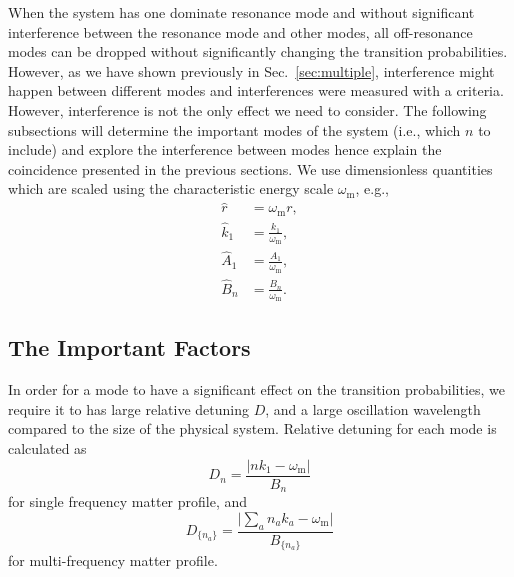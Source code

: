 \documentclass[%
reprint,
 amsmath,amssymb,
 prd,
]{revtex4-1}
\newcommand{\RD}{D}
\begin{document}
When the system has one dominate resonance mode and without significant interference between the resonance mode and other modes, all off-resonance modes can be dropped without significantly changing the transition probabilities. However, as we have shown previously in Sec.~\ref{sec:multiple}, interference might happen between different modes and interferences were measured with a criteria. However, interference is not the only effect we need to consider. The following subsections will determine the important modes of the system (i.e., which $n$ to include) and explore the interference between modes hence explain the coincidence presented in the previous sections. We use dimensionless quantities which are scaled using the characteristic energy scale $\omega_{\mathrm{m}}$, e.g.,
\begin{align*}
    \hat r &= \omega_{\mathrm{m}}r, \\
    \hat k_1 & = \frac{k_1}{\omega_{\mathrm{m}}}, \\
    \hat A_1 & = \frac{A_1}{\omega_{\mathrm{m}}}, \\
    \hat B_n &= \frac{B_n}{\omega_{\mathrm{m}}}.
\end{align*}







\subsection{The Important Factors}


In order for a mode to have a significant effect on the transition probabilities, we require it to has large relative detuning $\RD$, and a large oscillation wavelength compared to the size of the physical system. Relative detuning for each mode is calculated as
\begin{equation}
\RD_n = \frac{\lvert n k_1 - \omega_{\mathrm{m}} \rvert}{B_n}
\end{equation}
for single frequency matter profile, and
\begin{equation}
\RD_{\{n_a\}} = \frac{\lvert \sum_a n_a k_a -\omega_{\mathrm m} \rvert }{B_{\{n_a\}}}
\end{equation}
for multi-frequency matter profile.
\end{document}
